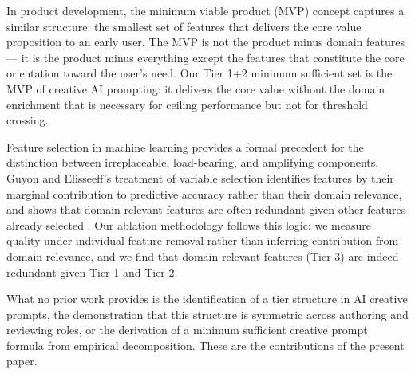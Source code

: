 In product development, the minimum viable product (MVP) concept captures a similar
structure: the smallest set of features that delivers the core value proposition to an
early user. The MVP is not the product minus domain features --- it is the product
minus everything except the features that constitute the core orientation toward the
user's need. Our Tier 1+2 minimum sufficient set is the MVP of creative AI prompting:
it delivers the core value without the domain enrichment that is necessary for ceiling
performance but not for threshold crossing.

Feature selection in machine learning provides a formal precedent for the distinction
between irreplaceable, load-bearing, and amplifying components. Guyon and Elisseeff's
treatment of variable selection identifies features by their marginal contribution to
predictive accuracy rather than their domain relevance, and shows that domain-relevant
features are often redundant given other features already selected \cite{guyon2003introduction}.
Our ablation methodology follows this logic: we measure quality under individual
feature removal rather than inferring contribution from domain relevance, and we find
that domain-relevant features (Tier 3) are indeed redundant given Tier 1 and Tier 2.

What no prior work provides is the identification of a tier structure in AI creative
prompts, the demonstration that this structure is symmetric across authoring and
reviewing roles, or the derivation of a minimum sufficient creative prompt formula
from empirical decomposition. These are the contributions of the present paper.
